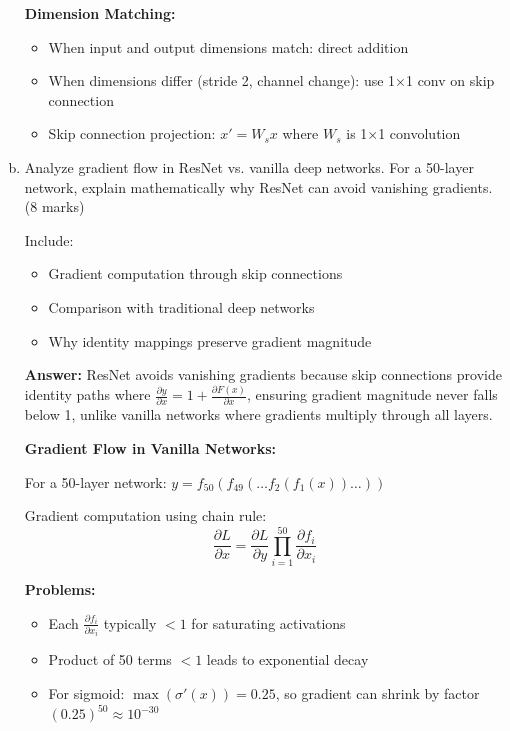 \documentclass[12pt]{article}
\newcommand{\answer}[1]{{\color{answercolor}\textbf{Answer:} #1}}
\newcommand{\explanation}[1]{{\color{explanationcolor}#1}}
\begin{document}
\begin{enumerate}[(a)]
{    \textbf{Dimension Matching:}
    \begin{itemize}
        \item When input and output dimensions match: direct addition
        \item When dimensions differ (stride 2, channel change): use 1×1 conv on skip connection
        \item Skip connection projection: $x' = W_s x$ where $W_s$ is 1×1 convolution
    \end{itemize}
    }
    
    \item Analyze gradient flow in ResNet vs. vanilla deep networks. For a 50-layer network, explain mathematically why ResNet can avoid vanishing gradients. \hfill (8 marks)
    
    Include:
    \begin{itemize}
        \item Gradient computation through skip connections
        \item Comparison with traditional deep networks
        \item Why identity mappings preserve gradient magnitude
    \end{itemize}
    
    \answer{ResNet avoids vanishing gradients because skip connections provide identity paths where $\frac{\partial y}{\partial x} = 1 + \frac{\partial F(x)}{\partial x}$, ensuring gradient magnitude never falls below 1, unlike vanilla networks where gradients multiply through all layers.}
    
    \explanation{
    \textbf{Gradient Flow in Vanilla Networks:}
    
    For a 50-layer network: $y = f_{50}(f_{49}(\ldots f_2(f_1(x)) \ldots))$
    
    Gradient computation using chain rule:
    $$\frac{\partial L}{\partial x} = \frac{\partial L}{\partial y} \prod_{i=1}^{50} \frac{\partial f_i}{\partial x_i}$$
    
    \textbf{Problems:}
    \begin{itemize}
        \item Each $\frac{\partial f_i}{\partial x_i}$ typically $< 1$ for saturating activations
        \item Product of 50 terms $< 1$ leads to exponential decay
        \item For sigmoid: $\max(\sigma'(x)) = 0.25$, so gradient can shrink by factor $(0.25)^{50} \approx 10^{-30}$
    \end{itemize}
    
}
\end{enumerate}
\end{document}

